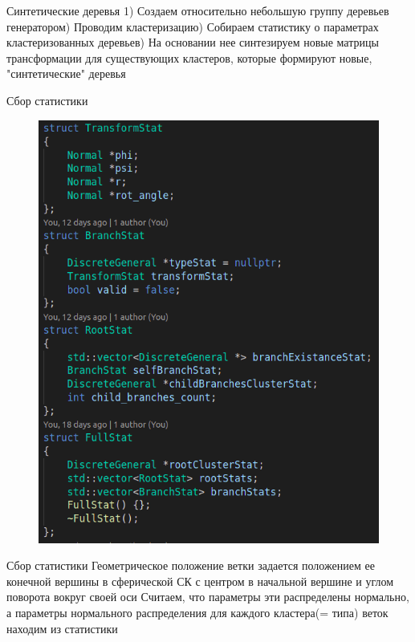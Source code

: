\documentclass[11pt]{beamer}
\begin{document}
\begin{frame}{Синтетические деревья}
1) Создаем относительно небольшую группу деревьев генератором) Проводим кластеризацию) Собираем статистику о параметрах кластеризованных деревьев) На основании нее синтезируем новые матрицы трансформации для существующих кластеров, которые формируют новые, "синтетические" деревья
\end{frame}
\begin{frame}{Сбор статистики}
\begin{figure}[hbtp]
\includegraphics[scale=0.315]{stat.png}
\end{figure}
\end{frame}
\begin{frame}{Сбор статистики}
Геометрическое положение ветки задается положением ее конечной вершины в сферической СК с центром в начальной вершине и углом поворота вокруг своей оси\linebreak	
Считаем, что параметры эти распределены нормально, а параметры нормального распределения для каждого кластера(= типа) веток находим из статистики
\end{frame}
\end{document}
